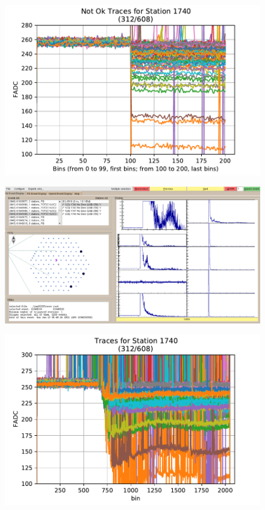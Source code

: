 \documentclass[aspectratio=169]{beamer}
\begin{document}
\begin{frame}
  \begin{figure}[h]
    \centering
    \includegraphics[width=.85\textwidth]{..//plots/traces1740.pdf}
    \end{figure}
\end{frame}

\begin{frame}
  \begin{figure}[h]
    \centering
    \includegraphics[width=1\textwidth]{..//plots/ed2044traces1740.png}
    \end{figure}
\end{frame}


\begin{frame}
  \begin{figure}[h]
    \centering
    \includegraphics[width=.85\textwidth]{..//plots/traces1740zoom.pdf}
    \end{figure}
\end{frame}
\end{document}

